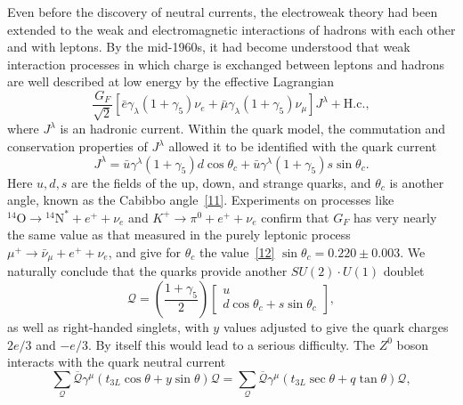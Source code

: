 Even before the discovery of neutral currents, the electroweak theory had been extended to the weak and electromagnetic interactions of hadrons with each other and with leptons. By the mid-1960s, it had become understood that weak interaction processes in which charge is exchanged between leptons and hadrons are well described at low energy by the effective Lagrangian
\begin{equation}
\frac{G_F}{\sqrt{2}}
\left[
\bar e\gamma_\lambda(1+\gamma_5)\nu_e
+\bar\mu\gamma_\lambda(1+\gamma_5)\nu_\mu
\right]J^\lambda+\mathrm{H.c.},
\tag{21.3.39}\label{eq:21.3.39}
\end{equation}
where $J^\lambda$ is an hadronic current. Within the quark model, the commutation and conservation properties of $J^\lambda$ allowed it to be identified with the quark current
\begin{equation}
J^\lambda
=\bar u\gamma^\lambda(1+\gamma_5)d\cos\theta_c
+\bar u\gamma^\lambda(1+\gamma_5)s\sin\theta_c.
\tag{21.3.40}\label{eq:21.3.40}
\end{equation}
Here $u,d,s$ are the fields of the up, down, and strange quarks, and $\theta_c$ is another angle, known as the Cabibbo angle~\hyperref[ch21-ref-11]{[11]}. Experiments on processes like ${}^{14}\mathrm O\to{}^{14}\mathrm N^*+e^++\nu_e$ and $K^+\to\pi^0+e^++\nu_e$ confirm that $G_F$ has very nearly the same value as that measured in the purely leptonic process $\mu^+\to\bar\nu_\mu+e^++\nu_e$, and give for $\theta_c$ the value~\hyperref[ch21-ref-12]{[12]} $\sin\theta_c=0.220\mathbin{\pm}0.003$. We naturally conclude that the quarks provide another $SU(2)\cdot U(1)$ doublet
\begin{equation}
\mathcal{Q}
=\left(\frac{1+\gamma_5}{2}\right)
\begin{bmatrix}
u\\
d\cos\theta_c+s\sin\theta_c
\end{bmatrix},
\tag{21.3.41}\label{eq:21.3.41}
\end{equation}
as well as right-handed singlets, with $y$ values adjusted to give the quark charges $2e/3$ and $-e/3$. By itself this would lead to a serious difficulty. The $Z^0$ boson interacts with the quark neutral current
\begin{equation}
\sum_{\mathcal Q}
\overline{\mathcal Q}\gamma^\mu
(t_{3L}\cos\theta+y\sin\theta)\mathcal Q
=
\sum_{\mathcal Q}
\overline{\mathcal Q}\gamma^\mu
(t_{3L}\sec\theta+q\tan\theta)\mathcal Q,
\tag{21.3.42}\label{eq:21.3.42}
\end{equation}
